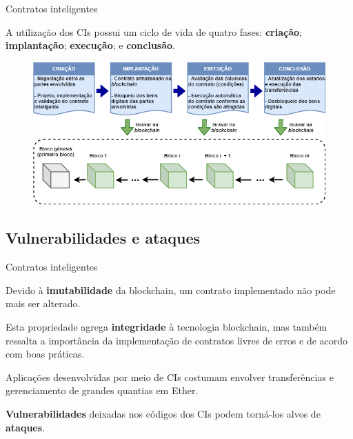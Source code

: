 \begin{frame}{Contratos inteligentes}
    \begin{block}{}
    A utilização dos CIs possui um ciclo de vida de quatro fases: \textbf{criação}; \textbf{implantação}; \textbf{execução}; e \textbf{conclusão}.
    \end{block}
    \begin{figure}[!htb]
        \centering
        \includegraphics[scale=0.4]{figuras/contratos-inteligentes/contrato_ciclo_de_vida.png}
    \end{figure}    
\end{frame}

\subsection{Vulnerabilidades e ataques}

\begin{frame}{Contratos inteligentes}
    \begin{block}{}
    Devido à \textbf{imutabilidade} da blockchain, um contrato implementado não pode mais ser alterado.
    \end{block}
    \begin{block}{}
    Esta propriedade agrega \textbf{integridade} à tecnologia blockchain, mas também ressalta a importância da implementação de contratos livres de erros e de acordo com boas práticas.
    \end{block}
    \begin{block}{}
	Aplicações desenvolvidas por meio de CIs costumam envolver transferências e gerenciamento de grandes quantias em Ether.
	\end{block}
    \begin{alertblock}{}
    \textbf{Vulnerabilidades} deixadas nos códigos dos CIs podem torná-los alvos de \textbf{ataques}.
    \end{alertblock}
\end{frame}

